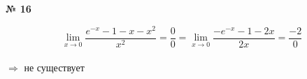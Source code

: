 \documentclass{article}
\begin{document}
\textbf{№ 16} 
\Large

$$ \lim\limits_{x\to 0} \frac{e^{-x}-1-x-x^2}{x^2}
= \frac{0}{0}
= \lim\limits_{x\to 0} \frac{-e^{-x}-1-2x}{2x}
= \frac{-2}{0} $$
\\
$\Rightarrow$ не существует 
\end{document}
